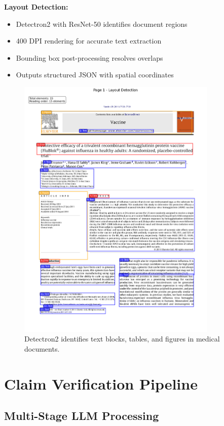 \documentclass[11pt]{article}
\begin{document}
\textbf{Layout Detection:}
\begin{itemize}
\item Detectron2 with ResNet-50 identifies document regions
\item 400 DPI rendering for accurate text extraction
\item Bounding box post-processing resolves overlaps
\item Outputs structured JSON with spatial coordinates
\end{itemize}

\begin{figure}[htbp]
\centering
\includegraphics[width=0.85\textwidth]{scientific_layout_example.png}
\caption{Detectron2 identifies text blocks, tables, and figures in medical documents.}
\end{figure}

\section{Claim Verification Pipeline}

\subsection{Multi-Stage LLM Processing}
\end{document}

